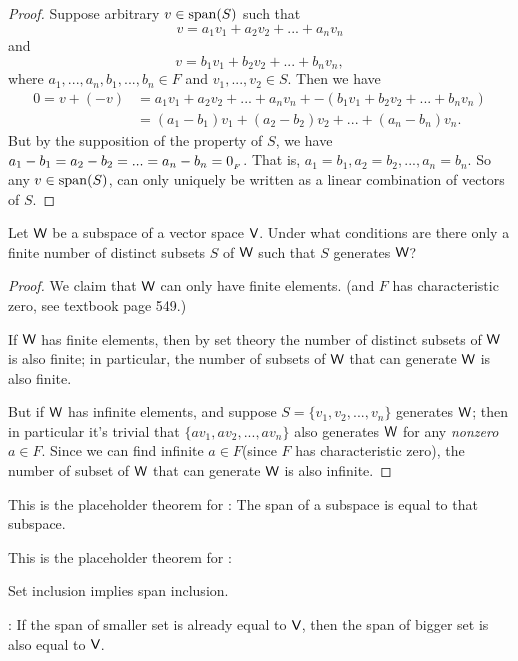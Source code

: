 \begin{proof}
Suppose arbitrary \(v \in \operatorname{span}(S)\) such that
\[
    v = a_1 v_1 + a_2 v_2 + ... + a_n v_n
\]
and
\[
    v = b_1 v_1 + b_2 v_2 + ... + b_n v_n,
\]
where \(a_1, ..., a_n, b_1, ..., b_n \in F\) and \(v_1, ..., v_2 \in S\).
Then we have
\begin{align*}
    0 = v + (-v) & = a_1 v_1 + a_2 v_2 + ... + a_n v_n + -(b_1 v_1 + b_2 v_2 + ... + b_n v_n) \\
                 & = (a_1 - b_1) v_1 + (a_2 - b_2) v_2 + ... + (a_n - b_n) v_n.
\end{align*}
But by the supposition of the property of \(S\), we have \(a_1 - b_1 = a_2 - b_2 = ... = a_n - b_n = 0_{_F}\).
That is, \(a_1 = b_1, a_2 = b_2, ..., a_n = b_n\).
So any \(v \in \operatorname{span}(S)\), can only uniquely be written as a linear combination of vectors of \(S\).
\end{proof}

\begin{exercise} \label{exercise 1.4.17}
Let \(\textsf{W}\) be a subspace of a vector space \(\textsf{V}\).
Under what conditions are there only a finite number of distinct subsets \(S\) of \(\textsf{W}\) such that \(S\) generates \(\textsf{W}\)?
\end{exercise}

\begin{proof}
We claim that \(\textsf{W}\) can only have finite elements. (and \(F\) has characteristic zero, see textbook page 549.)

If \(\textsf{W}\) has finite elements, then by set theory the number of distinct subsets of \(\textsf{W}\) is also finite;
in particular, the number of subsets of \(\textsf{W}\) that can generate \(\textsf{W}\) is also finite.

But if \(\textsf{W}\) has infinite elements, and suppose \(S = \{v_1, v_2, ..., v_n\}\) generates \(\textsf{W}\);
then in particular it's trivial that \(\{a v_1, a v_2, ..., a v_n\}\) also generates \(\textsf{W}\) for any \emph{nonzero} \(a \in F\).
Since we can find infinite \(a \in F\)(since \(F\) has characteristic zero), the number of subset of \(\textsf{W}\) that can generate \(\textsf{W}\) is also infinite.
\end{proof}

\begin{additional theorem} \label{athm 1.11}
This is the placeholder theorem for : The span of a subspace is equal to that subspace.
\end{additional theorem}

\begin{additional theorem} \label{athm 1.12}
This is the placeholder theorem for :

 Set inclusion implies span inclusion.

: If the span of smaller set is already equal to \(\textsf{V}\), then the span of bigger set is also equal to \(\textsf{V}\).
\end{additional theorem}

